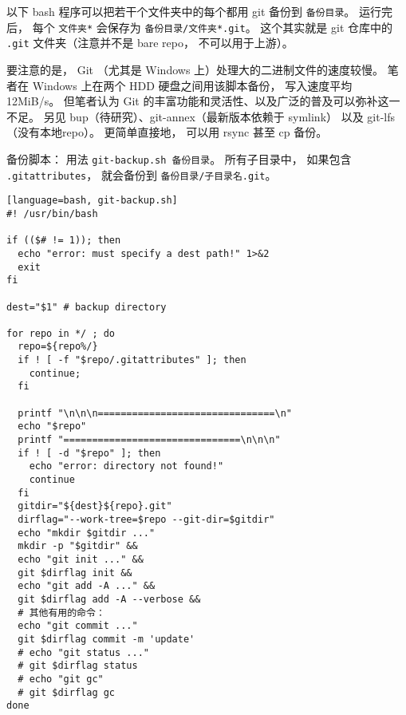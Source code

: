 
\begin{issues}
\issueDraft
\end{issues}


以下 bash 程序可以把若干个文件夹中的每个都用 git 备份到 \verb|备份目录|。 运行完后， 每个 \verb|文件夹*| 会保存为 \verb|备份目录/文件夹*.git|。 这个其实就是 git 仓库中的 \verb|.git| 文件夹（注意并不是 bare repo， 不可以用于上游）。

要注意的是， Git （尤其是 Windows 上）处理大的二进制文件的速度较慢。 笔者在 Windows 上在两个 HDD 硬盘之间用该脚本备份， 写入速度平均 12MiB/s。 但笔者认为 Git 的丰富功能和灵活性、以及广泛的普及可以弥补这一不足。 另见 bup（待研究）、git-annex（最新版本依赖于 symlink） 以及 git-lfs（没有本地repo）。 更简单直接地， 可以用 rsync 甚至 cp 备份。

备份脚本： 用法 \verb|git-backup.sh 备份目录|。 所有子目录中， 如果包含 \verb|.gitattributes|， 就会备份到 \verb|备份目录/子目录名.git|。
\begin{lstlisting}[language=bash, git-backup.sh]
#! /usr/bin/bash

if (($# != 1)); then
  echo "error: must specify a dest path!" 1>&2
  exit
fi

dest="$1" # backup directory

for repo in */ ; do
  repo=${repo%/}
  if ! [ -f "$repo/.gitattributes" ]; then
    continue;
  fi

  printf "\n\n\n===============================\n"
  echo "$repo"
  printf "===============================\n\n\n"
  if ! [ -d "$repo" ]; then
    echo "error: directory not found!"
    continue
  fi
  gitdir="${dest}${repo}.git"
  dirflag="--work-tree=$repo --git-dir=$gitdir"
  echo "mkdir $gitdir ..."
  mkdir -p "$gitdir" &&
  echo "git init ..." &&
  git $dirflag init &&
  echo "git add -A ..." &&
  git $dirflag add -A --verbose &&
  # 其他有用的命令：
  echo "git commit ..."
  git $dirflag commit -m 'update'
  # echo "git status ..."
  # git $dirflag status
  # echo "git gc"
  # git $dirflag gc
done
\end{lstlisting}

